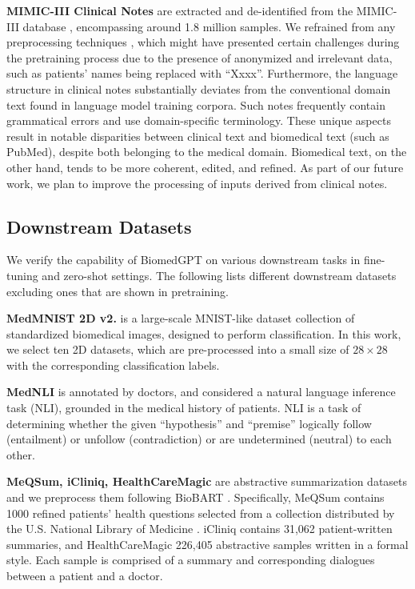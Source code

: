 \documentclass[10pt]{article} \usepackage[preprint]{tmlr}
\begin{document}
\noindent \textbf{MIMIC-III Clinical Notes} are extracted and de-identified from the MIMIC-III database \citep{goldberger2000physiobank, johnson2016mimic}, encompassing around 1.8 million samples. We refrained from any preprocessing techniques \citep{nuthakki2019natural}, which might have presented certain challenges during the pretraining process due to the presence of anonymized and irrelevant data, such as patients' names being replaced with ``Xxxx''. Furthermore, the language structure in clinical notes substantially deviates from the conventional domain text found in language model training corpora. Such notes frequently contain grammatical errors and use domain-specific terminology. These unique aspects result in notable disparities between clinical text and biomedical text (such as PubMed), despite both belonging to the medical domain. Biomedical text, on the other hand, tends to be more coherent, edited, and refined. As part of our future work, we plan to improve the processing of inputs derived from clinical notes.

\subsection{Downstream Datasets}
We verify the capability of BiomedGPT on various downstream tasks in fine-tuning and zero-shot settings. The following lists different downstream datasets excluding ones that are shown in pretraining. 
\vspace{5pt}



\noindent \textbf{MedMNIST 2D v2.} \citep{medmnistv2} is a large-scale MNIST-like dataset collection of standardized biomedical images, designed to perform classification. In this work, we select ten 2D datasets, which are pre-processed into a small size of $28 \times 28$ with the corresponding classification labels. 
\vspace{5pt}

\noindent \textbf{MedNLI} \citep{romanov2018lessons} is annotated by doctors, and considered a natural language inference task (NLI), grounded in the medical history of patients. NLI is a task of determining whether the given “hypothesis” and “premise” logically follow (entailment) or unfollow (contradiction) or are undetermined (neutral) to each other.
\vspace{5pt}

\noindent \textbf{MeQSum, iCliniq, HealthCareMagic} \citep{abacha2019summarization, zeng2020meddialog} are abstractive summarization datasets and we preprocess them following BioBART \citep{yuan2022biobart}. Specifically, MeQSum contains 1000 refined patients’ health questions selected from a collection distributed by the U.S. National Library of Medicine \citep{kilicoglu2018semantic}. iCliniq contains 31,062 patient-written summaries, and HealthCareMagic 226,405 abstractive samples written in a formal style. Each sample is comprised of a summary and corresponding dialogues between a patient and a doctor.
\end{document}
